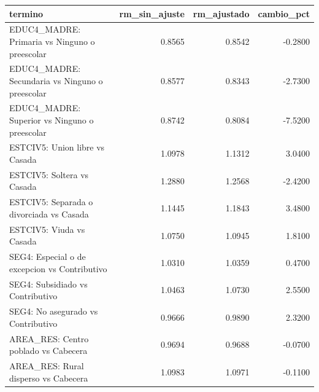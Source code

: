 \begin{tabular}{lrrr}
\toprule
termino & rm\_sin\_ajuste & rm\_ajustado & cambio\_pct \\
\midrule
EDUC4\_MADRE: Primaria vs Ninguno o preescolar & 0.8565 & 0.8542 & -0.2800 \\
EDUC4\_MADRE: Secundaria vs Ninguno o preescolar & 0.8577 & 0.8343 & -2.7300 \\
EDUC4\_MADRE: Superior vs Ninguno o preescolar & 0.8742 & 0.8084 & -7.5200 \\
ESTCIV5: Union libre vs Casada & 1.0978 & 1.1312 & 3.0400 \\
ESTCIV5: Soltera vs Casada & 1.2880 & 1.2568 & -2.4200 \\
ESTCIV5: Separada o divorciada vs Casada & 1.1445 & 1.1843 & 3.4800 \\
ESTCIV5: Viuda vs Casada & 1.0750 & 1.0945 & 1.8100 \\
SEG4: Especial o de excepcion vs Contributivo & 1.0310 & 1.0359 & 0.4700 \\
SEG4: Subsidiado vs Contributivo & 1.0463 & 1.0730 & 2.5500 \\
SEG4: No asegurado vs Contributivo & 0.9666 & 0.9890 & 2.3200 \\
AREA\_RES: Centro poblado vs Cabecera & 0.9694 & 0.9688 & -0.0700 \\
AREA\_RES: Rural disperso vs Cabecera & 1.0983 & 1.0971 & -0.1100 \\
\bottomrule
\end{tabular}

